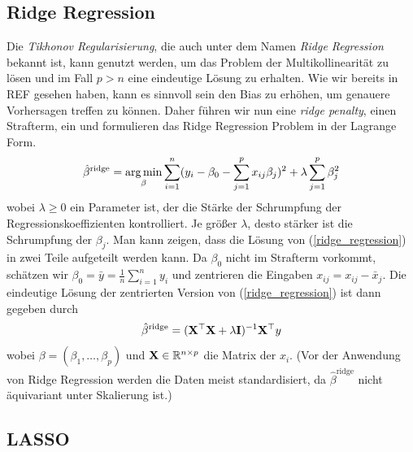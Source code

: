 \subsection{Ridge Regression}

Die \textit{Tikhonov Regularisierung}, die auch unter dem Namen \textit{Ridge Regression} bekannt ist, kann genutzt werden, um das Problem der Multikollinearität zu lösen und im Fall $p > n$ eine eindeutige Lösung zu erhalten.
Wie wir bereits in REF gesehen haben, kann es sinnvoll sein den Bias zu erhöhen, um genauere Vorhersagen treffen zu können. Daher führen wir nun eine \textit{ridge penalty}, einen Strafterm, ein und formulieren das Ridge Regression Problem in der Lagrange Form.
\begin{align}
\label{ridge_regression}
\hat{\beta}^{\text{ridge}} = \operatorname*{arg\,min}_{\beta} \sum_{i=1}^{n}(y_i - \beta_0 - \sum_{j=1}^p x_{ij}\beta_j)^2 + \lambda\sum_{j=1}^p \beta_j^2
\end{align}
wobei $\lambda \geq 0$ ein Parameter ist, der die Stärke der Schrumpfung der Regressionskoeffizienten kontrolliert. Je größer $\lambda$, desto stärker ist die Schrumpfung der $\beta_j$. Man kann zeigen, dass die Lösung von (\ref{ridge_regression}) in zwei Teile aufgeteilt werden kann. Da $\beta_0$ nicht im Strafterm vorkommt, schätzen wir $\beta_0 = \bar{y} = \frac{1}{n}\sum_{i=1}^{n} y_i$ und zentrieren die Eingaben $x_{ij} = x_{ij} - \bar{x}_j$. Die eindeutige Lösung der zentrierten Version von (\ref{ridge_regression}) ist dann gegeben durch
\begin{align}
\hat{\beta}^{\text{ridge}}  = (\mathbf{X}^{\top} \mathbf{X} + \lambda\mathbf{I})^{-1}\mathbf{X}^{\top}y
\end{align}
wobei $\beta = (\beta_1, \ldots, \beta_p)$ und $\mathbf{X} \in \mathbb{R}^{n \times p}$ die Matrix der $x_i$. (Vor der Anwendung von Ridge Regression werden die Daten meist standardisiert, da $\hat{\beta}^{\text{ridge}}$ nicht äquivariant unter Skalierung ist.) \\


\subsection{LASSO}
\label{lasso}

